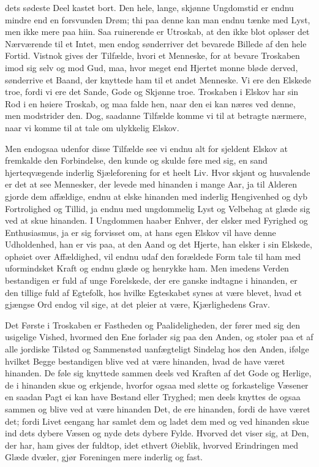 \documentclass[12pt,a4paper]{book}
\newcommand{\apage}[1]{\marginnote{\footnotesize\textit{[#1]}}}
\begin{document}
dets sødeste Deel kastet bort. Den hele, lange, skjønne Ungdomstid er
endnu mindre end en forsvunden Drøm; thi paa denne kan man endnu tænke
med Lyst, men ikke mere paa hiin. Saa ruinerende er Utroskab, at den
ikke blot opløser det Nærværende til et Intet, men endog sønderriver det
bevarede Billede af den hele Fortid. Vistnok gives der Tilfælde, hvori
et Menneske, for at bevare Troskaben imod sig selv og mod Gud, maa, hvor
meget end Hjertet monne bløde derved, sønderrive et Baand, der knyttede
ham til et andet Menneske. Vi ere den Elskede troe, fordi vi ere det
Sande, Gode og Skjønne troe. Troskaben i Elskov har sin Rod i en høiere
Troskab, og maa falde hen, naar den ei kan næres ved denne, men
modstrider den. Dog, saadanne Tilfælde komme vi til at betragte
nærmere, naar vi komme til at tale om ulykkelig Elskov. \apage{63}

Men endogsaa udenfor disse Tilfælde see vi endnu alt for sjeldent Elskov
at fremkalde den Forbindelse, den kunde og skulde føre med sig, en sand
hjerteqvægende inderlig Sjæleforening for et heelt Liv. Hvor skjønt og
husvalende er det at see Mennesker, der levede med hinanden i mange Aar,
ja til Alderen gjorde dem affældige, endnu at elske hinanden med
inderlig Hengivenhed og dyb Fortrolighed og Tillid, ja endnu med
ungdommelig Lyst og Velbehag at glæde sig ved at skue hinanden. I
Ungdommen haaber Enhver, der elsker med Fyrighed og Enthusiasmus, ja er
sig forvisset om, at hans egen Elskov vil have denne Udholdenhed, han er
vis paa, at den Aand og det Hjerte, han elsker i sin Elskede, ophøiet
over Affældighed, vil endnu udaf den forældede Form tale til ham med
uformindsket Kraft og endnu glæde og henrykke ham. Men imedens Verden
bestandigen er fuld af unge Forelskede, der ere ganske indtagne i
hinanden, er den tillige fuld af Egtefolk, hos hvilke Egteskabet synes
at være blevet, hvad et gjængse Ord endog vil sige, at det pleier at
være, Kjærlighedens Grav.

Det Første i Troskaben er Fastheden og Paalideligheden, der fører med
sig den usigelige Vished, hvormed den Ene forlader sig paa den Anden, og
stoler paa et af alle jordiske Tilstød og Sammenstød uanfægteligt
Sindelag hos den Anden, ifølge hvilket Begge bestandigen blive ved at
være hinanden, hvad de have været hinanden. De føle sig knyttede sammen
deels ved \apage{64} Kraften af det Gode og Herlige, de i hinanden skue og
erkjende, hvorfor ogsaa med slette og forkastelige Væsener en saadan
Pagt ei kan have Bestand eller Tryghed; men deels knyttes de ogsaa
sammen og blive ved at være hinanden Det, de ere hinanden, fordi de have
været det; fordi Livet eengang har samlet dem og ladet dem med og ved
hinanden skue ind dets dybere Væsen og nyde dets dybere Fylde.
Hvorved det viser sig, at Den, der har, ham gives der fuldtop, idet
ethvert Øieblik, hvorved Erindringen med Glæde dvæler, gjør Foreningen
mere inderlig og fast.
\end{document}
